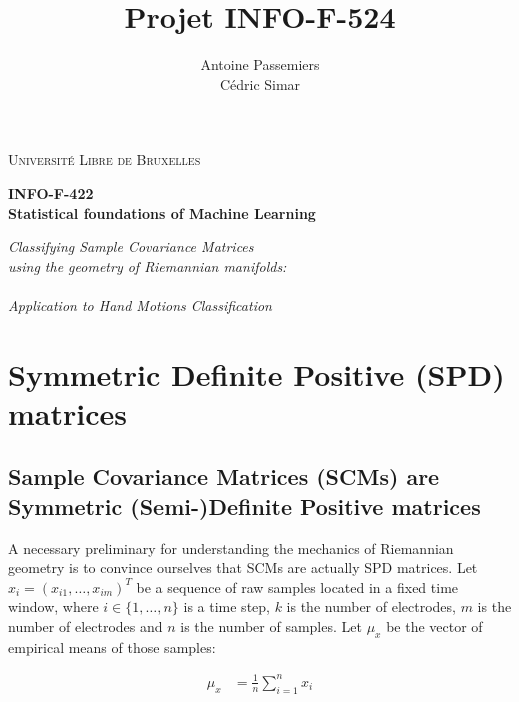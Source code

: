 \documentclass[a4paper,11pt]{report}
\title{Projet INFO-F-524}
\author{
	Antoine Passemiers \\
	Cédric Simar
}
\makeatletter
\renewcommand\bibname{Références}
\renewcommand{\refname}{Références}
\renewcommand\@biblabel[1]{#1.  }
\makeatother
\begin{document}
\renewcommand\bibname{References}
\renewcommand{\refname}{References}
\makeatletter
\renewcommand\@biblabel[1]{#1.  }
\makeatother

\begin{titlepage}
	\centering
	{\scshape\LARGE Université Libre de Bruxelles\par}
	\vfill
	{\LARGE\bfseries INFO-F-422 \\ Statistical foundations of Machine Learning \par
		\vspace{3ex}}
	{\itshape\Large Classifying Sample Covariance Matrices \\ using the geometry of Riemannian manifolds: \\\ \\ Application to Hand Motions Classification \par}
	\vfill
	\makeatletter
	{\large \@author\par}
	\vfill
	\@date\par
	\makeatother
\end{titlepage}

\tableofcontents

\setlength\parskip{0.5ex plus1ex minus.5ex}

\newpage



\chapter{Symmetric Definite Positive (SPD) matrices}

\section{Sample Covariance Matrices (SCMs) are Symmetric (Semi-)Definite Positive matrices}

A necessary preliminary for understanding the mechanics of Riemannian geometry is to convince ourselves that
SCMs are actually SPD matrices. Let $x_i = (x_{i1}, \ldots, x_{im})^T$ be a sequence of raw samples
located in a fixed time window, where $i \in \{1, \ldots, n\}$ is a time step, $k$ is the number of electrodes,
$m$ is the number of electrodes and $n$ is the number of samples.
Let $\mu_x$ be the vector of empirical means of those samples:

\begin{align}
  \mu_x & = \frac{1}{n} \sum\limits_{i=1}^{n} x_i
\end{align}
\end{document}
